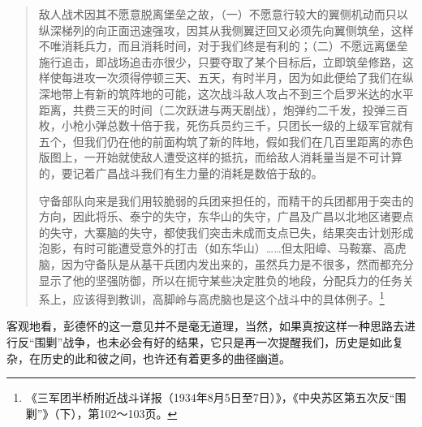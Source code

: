 \begin{quote}

敌人战术因其不愿意脱离堡垒之故，（一）不愿意行较大的翼侧机动而只以纵深梯列的向正面迅速强攻，因其从我侧翼迂回又必须先向翼侧筑垒，这样不唯消耗兵力，而且消耗时间，对于我们终是有利的；（二）不愿远离堡垒施行追击，即战场追击亦很少，只要夺取了某个目标后，立即筑垒修路，这样使每进攻一次须得停顿三天、五天，有时半月，因为如此便给了我们在纵深地带上有新的筑阵地的可能，这次战斗敌人攻占不到三个启罗米达的水平距离，共费三天的时间（二次跃进与两天剧战），炮弹约二千发，投弹三百枚，小枪小弹总数十倍于我，死伤兵员约三千，只团长一级的上级军官就有五个，但我们仍在他的前面构筑了新的阵地，假如我们在几百里距离的赤色版图上，一开始就使敌人遭受这样的抵抗，而给敌人消耗量当是不可计算的，要记着广昌战斗我们有生力量的消耗是数倍于敌的。

守备部队向来是我们用较脆弱的兵团来担任的，而精干的兵团都用于突击的方向，因此将乐、泰宁的失守，东华山的失守，广昌及广昌以北地区诸要点的失守，大寨脑的失守，都使我们突击未成而支点已失，结果突击计划形成泡影，有时可能遭受意外的打击（如东华山）……但太阳嶂、马鞍寨、高虎脑，因为守备队是从基干兵团内发出来的，虽然兵力是不很多，然而都充分显示了他的坚强防御，所以在扼守某些决定胜负的地段，分配兵力的任务关系上，应该得到教训，高脚岭与高虎脑也是这个战斗中的具体例子。\footnote{《三军团半桥附近战斗详报（1934年8月5日至7日）》，《中央苏区第五次反“围剿”》（下），第102～103页。}
\end{quote}


客观地看，彭德怀的这一意见并不是毫无道理，当然，如果真按这样一种思路去进行反“围剿”战争，也未必会有好的结果，它只是再一次提醒我们，历史是如此复杂，在历史的此和彼之间，也许还有着更多的曲径幽道。

